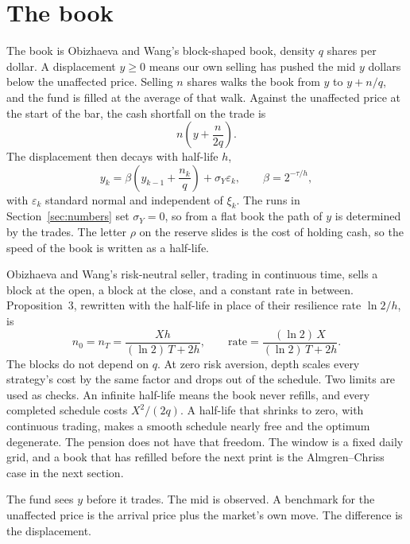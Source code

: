 \documentclass[11pt]{article}
\begin{document}
\section{The book}
\label{sec:book}

The book is Obizhaeva and Wang's block-shaped book, density \(q\) shares per dollar. A displacement \(y \geq 0\) means our own selling has pushed the mid \(y\) dollars below the unaffected price. Selling \(n\) shares walks the book from \(y\) to \(y + n/q\), and the fund is filled at the average of that walk. Against the unaffected price at the start of the bar, the cash shortfall on the trade is
\begin{equation}
\label{eq:walk}
n\left(y + \frac{n}{2q}\right).
\end{equation}
The displacement then decays with half-life \(h\),
\begin{equation}
\label{eq:decay}
y_k = \beta\left(y_{k-1} + \frac{n_k}{q}\right) + \sigma_Y \varepsilon_k,
\qquad
\beta = 2^{-\tau/h},
\end{equation}
with \(\varepsilon_k\) standard normal and independent of \(\xi_k\). The runs in Section~\ref{sec:numbers} set \(\sigma_Y = 0\), so from a flat book the path of \(y\) is determined by the trades. The letter \(\rho\) on the reserve slides is the cost of holding cash, so the speed of the book is written as a half-life.

Obizhaeva and Wang's risk-neutral seller, trading in continuous time, sells a block at the open, a block at the close, and a constant rate in between. Proposition~3, rewritten with the half-life in place of their resilience rate \(\ln 2 / h\), is
\begin{equation}
\label{eq:ow}
n_0 = n_T = \frac{X h}{(\ln 2)\, T + 2h}, \qquad
\text{rate} = \frac{(\ln 2)\, X}{(\ln 2)\, T + 2h}.
\end{equation}
The blocks do not depend on \(q\). At zero risk aversion, depth scales every strategy's cost by the same factor and drops out of the schedule. Two limits are used as checks. An infinite half-life means the book never refills, and every completed schedule costs \(X^{2}/(2q)\). A half-life that shrinks to zero, with continuous trading, makes a smooth schedule nearly free and the optimum degenerate. The pension does not have that freedom. The window is a fixed daily grid, and a book that has refilled before the next print is the Almgren--Chriss case in the next section.

The fund sees \(y\) before it trades. The mid is observed. A benchmark for the unaffected price is the arrival price plus the market's own move. The difference is the displacement.
\end{document}
